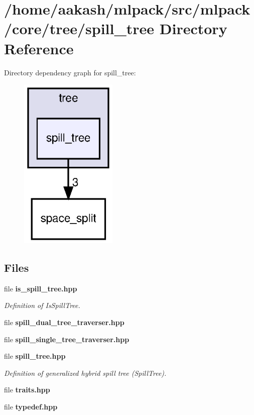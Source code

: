 \section{/home/aakash/mlpack/src/mlpack/core/tree/spill\+\_\+tree Directory Reference}
\label{dir_337db9a6a47b9eca6587909f40224d7c}
Directory dependency graph for spill\+\_\+tree\+:
\nopagebreak
\begin{figure}[H]
\begin{center}
\leavevmode
\includegraphics[width=132pt]{dir_337db9a6a47b9eca6587909f40224d7c_dep}
\end{center}
\end{figure}
\subsection*{Files}
\begin{DoxyCompactItemize}
\item 
file \textbf{ is\+\_\+spill\+\_\+tree.\+hpp}
\begin{DoxyCompactList}\small\item\em Definition of Is\+Spill\+Tree. \end{DoxyCompactList}\item 
file \textbf{ spill\+\_\+dual\+\_\+tree\+\_\+traverser.\+hpp}
\item 
file \textbf{ spill\+\_\+single\+\_\+tree\+\_\+traverser.\+hpp}
\item 
file \textbf{ spill\+\_\+tree.\+hpp}
\begin{DoxyCompactList}\small\item\em Definition of generalized hybrid spill tree (Spill\+Tree). \end{DoxyCompactList}\item 
file \textbf{ traits.\+hpp}
\item 
file \textbf{ typedef.\+hpp}
\end{DoxyCompactItemize}
